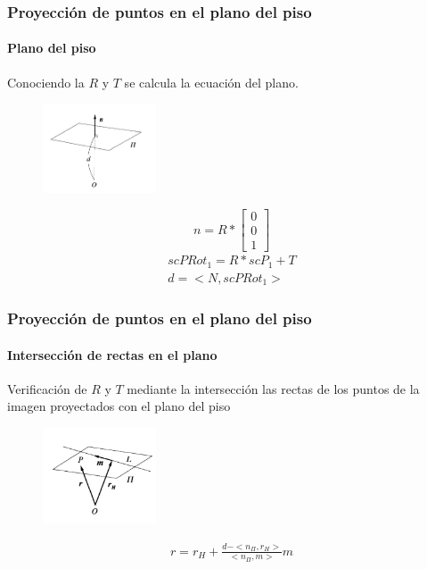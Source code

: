 \documentclass[10pt, compress]{beamer}
\begin{document}
\begin{frame}[fragile]
	\frametitle{Proyección de puntos en el plano del piso}
	\framesubtitle{Plano del piso}
	Conociendo la $R$ y $T$ se calcula la ecuación del plano.
	\begin{figure}[htbp]
		\includegraphics[width=0.3\textwidth]{./pictures/plane}
	\end{figure}
		 \[n=R*\begin{bmatrix}
		 0\\
		 0\\
		 1	
		 \end{bmatrix}\]
		 		\begin{eqnarray}
		 		scPRot_1=R*scP_1+T\\
		 		d=<N,scPRot_1>
		 		\end{eqnarray}
\end{frame}

\begin{frame}[fragile]
	\frametitle{Proyección de puntos en el plano del piso}
	\framesubtitle{Intersección de rectas en el plano}
Verificación de $R$ y $T$ mediante la intersección las rectas de los puntos de la imagen proyectados con el plano del piso
		\begin{figure}[htbp]
			\includegraphics[width=0.3\textwidth]{./pictures/intersec}
		\end{figure}
		\begin{eqnarray}
		r=r_H+\frac{d-<n_{\Pi}, r_H>}{<n_{\Pi},m>}m
		\end{eqnarray}
\end{frame}
\end{document}
